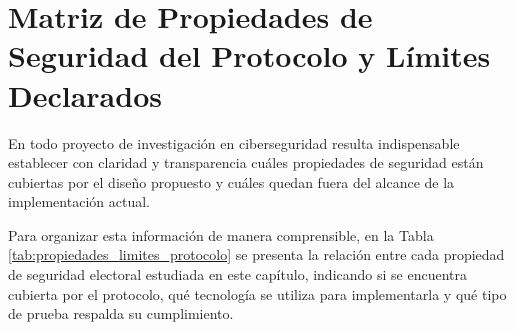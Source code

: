 \section{Matriz de Propiedades de Seguridad del Protocolo y Límites Declarados}
\label{sec:tabla_propiedades_limites}

En todo proyecto de investigación en ciberseguridad resulta indispensable establecer con claridad y transparencia cuáles propiedades de seguridad están cubiertas por el diseño propuesto y cuáles quedan fuera del alcance de la implementación actual.

Para organizar esta información de manera comprensible, en la Tabla \ref{tab:propiedades_limites_protocolo} se presenta la relación entre cada propiedad de seguridad electoral estudiada en este capítulo, indicando si se encuentra cubierta por el protocolo, qué tecnología se utiliza para implementarla y qué tipo de prueba respalda su cumplimiento.

